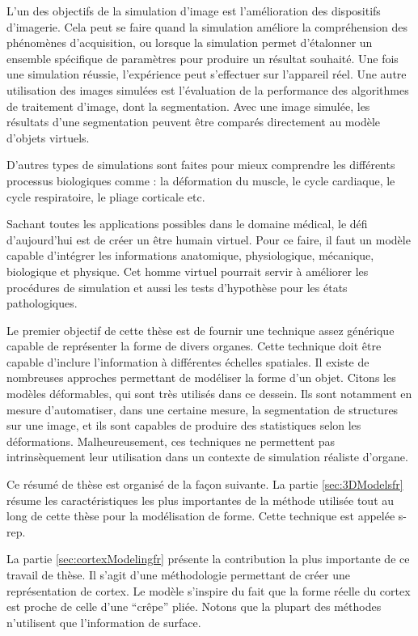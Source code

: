 L'un des objectifs de la simulation d'image est l'amélioration des dispositifs d'imagerie.
Cela peut se faire quand la simulation améliore la compréhension des phénomènes d'acquisition, 
ou lorsque la simulation permet d'étalonner un ensemble spécifique de paramètres pour produire un résultat souhaité.
Une fois une simulation réussie, l'expérience peut s'effectuer sur l'appareil réel.
Une autre utilisation des images simulées est l'évaluation de la performance des algorithmes de traitement d'image, dont la segmentation.
Avec une image simulée, les résultats d'une segmentation peuvent être comparés directement au modèle d'objets virtuels.

D'autres types de simulations sont faites pour mieux comprendre les différents processus biologiques comme :
la déformation du muscle, le cycle cardiaque, le cycle respiratoire, le pliage corticale etc.

Sachant toutes les applications possibles dans le domaine médical,
le défi d'aujourd'hui est de créer un être humain virtuel.
Pour ce faire, il faut un modèle capable d'intégrer les informations anatomique, physiologique, mécanique,
biologique et physique.
Cet homme virtuel pourrait servir à améliorer les procédures de simulation
et aussi les tests d'hypothèse pour les états pathologiques.

Le premier objectif de cette thèse
est de fournir une technique assez 
générique capable de représenter la forme de divers organes.
Cette technique doit être capable d'inclure l'information
à différentes échelles spatiales.
Il existe de nombreuses approches permettant de modéliser la forme d'un objet.
Citons les modèles déformables, qui sont très utilisés dans ce dessein.
Ils sont notamment en mesure d'automatiser, dans une certaine mesure,
la segmentation de structures sur une image, et ils sont capables de produire des statistiques selon les déformations.
Malheureusement, ces techniques
ne permettent pas intrinsèquement leur utilisation dans un contexte de simulation réaliste d'organe.

Ce résumé de thèse est organisé de la façon suivante. 
La partie \ref{sec:3DModelsfr} résume les caractéristiques les
plus importantes de la méthode utilisée tout au long de cette thèse 
pour la modélisation de forme. Cette technique est appelée s-rep. 

La partie \ref{sec:cortexModelingfr} présente la contribution la
plus importante de ce travail de thèse.
Il s'agit d'une méthodologie permettant de créer une représentation de cortex.
Le modèle s'inspire du fait que la forme réelle du cortex est proche de celle d'une ``crêpe'' pliée.
Notons que la plupart des méthodes n'utilisent que l'information de surface.

